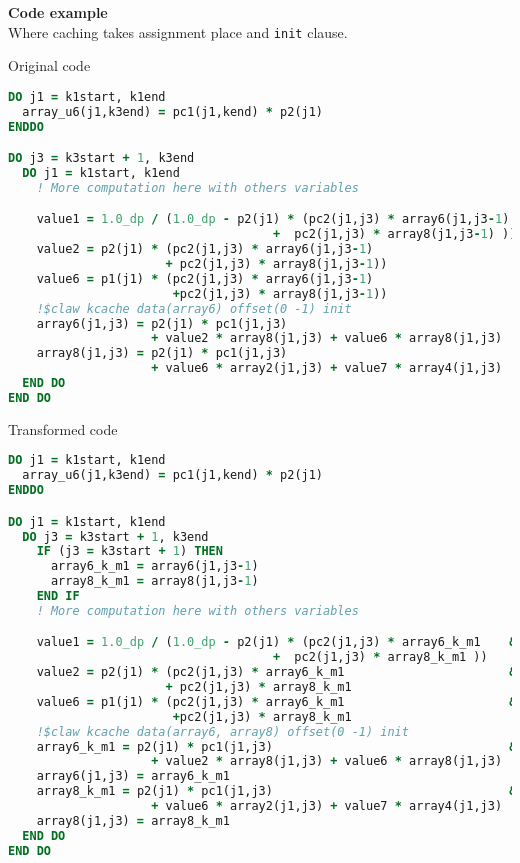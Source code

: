 \textbf{Code example}\\
\label{kcache1}
Where caching takes assignment place and \lstinline!init! clause.

Original code
\begin{lstlisting}[language=Fortran]
DO j1 = k1start, k1end
  array_u6(j1,k3end) = pc1(j1,kend) * p2(j1)
ENDDO

DO j3 = k3start + 1, k3end
  DO j1 = k1start, k1end
    ! More computation here with others variables

    value1 = 1.0_dp / (1.0_dp - p2(j1) * (pc2(j1,j3) * array6(j1,j3-1)  &
                                     +  pc2(j1,j3) * array8(j1,j3-1) ))
    value2 = p2(j1) * (pc2(j1,j3) * array6(j1,j3-1)                     &
                      + pc2(j1,j3) * array8(j1,j3-1))
    value6 = p1(j1) * (pc2(j1,j3) * array6(j1,j3-1)                     &
                       +pc2(j1,j3) * array8(j1,j3-1))
	!$claw kcache data(array6) offset(0 -1) init
    array6(j1,j3) = p2(j1) * pc1(j1,j3)                                 &
                    + value2 * array8(j1,j3) + value6 * array8(j1,j3)
    array8(j1,j3) = p2(j1) * pc1(j1,j3)                                 &
                    + value6 * array2(j1,j3) + value7 * array4(j1,j3)
  END DO
END DO
\end{lstlisting}


Transformed code
\begin{lstlisting}[language=Fortran]
DO j1 = k1start, k1end
  array_u6(j1,k3end) = pc1(j1,kend) * p2(j1)
ENDDO

DO j1 = k1start, k1end
  DO j3 = k3start + 1, k3end
    IF (j3 = k3start + 1) THEN
      array6_k_m1 = array6(j1,j3-1)
      array8_k_m1 = array8(j1,j3-1)
    END IF
    ! More computation here with others variables

    value1 = 1.0_dp / (1.0_dp - p2(j1) * (pc2(j1,j3) * array6_k_m1    &
                                     +  pc2(j1,j3) * array8_k_m1 ))
    value2 = p2(j1) * (pc2(j1,j3) * array6_k_m1                       &
                      + pc2(j1,j3) * array8_k_m1
    value6 = p1(j1) * (pc2(j1,j3) * array6_k_m1                       &
                       +pc2(j1,j3) * array8_k_m1
	!$claw kcache data(array6, array8) offset(0 -1) init
	array6_k_m1 = p2(j1) * pc1(j1,j3)                                 &
                    + value2 * array8(j1,j3) + value6 * array8(j1,j3)
    array6(j1,j3) = array6_k_m1
    array8_k_m1 = p2(j1) * pc1(j1,j3)                                 &
                    + value6 * array2(j1,j3) + value7 * array4(j1,j3)
    array8(j1,j3) = array8_k_m1
  END DO
END DO
\end{lstlisting}

